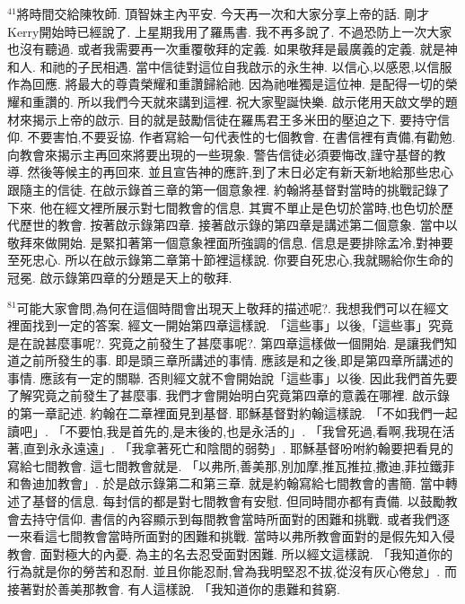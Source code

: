 \documentclass{book}
\begin{document}
$^{41}$將時間交給陳牧師.
頂智妹主內平安.
今天再一次和大家分享上帝的話.
剛才Kerry開始時已經說了.
上星期我用了羅馬書.
我不再多說了.
不過恐防上一次大家也沒有聽過.
或者我需要再一次重覆敬拜的定義.
如果敬拜是最廣義的定義.
就是神和人.
和祂的子民相遇.
當中信徒對這位自我啟示的永生神.
以信心,以感恩,以信服作為回應.
將最大的尊貴榮耀和重讚歸給祂.
因為祂唯獨是這位神.
是配得一切的榮耀和重讚的.
所以我們今天就來講到這裡.
祝大家聖誕快樂.
啟示佬用天啟文學的題材來揭示上帝的啟示.
目的就是鼓勵信徒在羅馬君王多米田的壓迫之下.
要持守信仰.
不要害怕,不要妥協.
作者寫給一句代表性的七個教會.
在書信裡有責備,有勸勉.
向教會來揭示主再回來將要出現的一些現象.
警告信徒必須要悔改,謹守基督的教導.
然後等候主的再回來.
並且宣告神的應許,到了末日必定有新天新地給那些忠心跟隨主的信徒.
在啟示錄首三章的第一個意象裡.
約翰將基督對當時的挑戰記錄了下來.
他在經文裡所展示對七間教會的信息.
其實不單止是色切於當時,也色切於歷代歷世的教會.
按著啟示錄第四章.
接著啟示錄的第四章是講述第二個意象.
當中以敬拜來做開始.
是緊扣著第一個意象裡面所強調的信息.
信息是要排除孟冷,對神要至死忠心.
所以在啟示錄第二章第十節裡這樣說.
你要自死忠心,我就賜給你生命的冠冕.
啟示錄第四章的分題是天上的敬拜.

$^{81}$可能大家會問,為何在這個時間會出現天上敬拜的描述呢?.
我想我們可以在經文裡面找到一定的答案.
經文一開始第四章這樣說.
「這些事」以後,「這些事」究竟是在說甚麼事呢?.
究竟之前發生了甚麼事呢?.
第四章這樣做一個開始.
是讓我們知道之前所發生的事.
即是頭三章所講述的事情.
應該是和之後,即是第四章所講述的事情.
應該有一定的關聯.
否則經文就不會開始說「這些事」以後.
因此我們首先要了解究竟之前發生了甚麼事.
我們才會開始明白究竟第四章的意義在哪裡.
啟示錄的第一章記述.
約翰在二章裡面見到基督.
耶穌基督對約翰這樣說.
「不如我們一起讀吧」.
「不要怕,我是首先的,是末後的,也是永活的」.
「我曾死過,看啊,我現在活著,直到永永遠遠」.
「我拿著死亡和陰間的弱勢」.
耶穌基督吩咐約翰要把看見的寫給七間教會.
這七間教會就是.
「以弗所,善美那,別加摩,推瓦推拉,撒迪,菲拉鐵菲和魯迪加教會」.
於是啟示錄第二和第三章.
就是約翰寫給七間教會的書簡.
當中轉述了基督的信息.
每封信的都是對七間教會有安慰.
但同時間亦都有責備.
以鼓勵教會去持守信仰.
書信的內容顯示到每間教會當時所面對的困難和挑戰.
或者我們逐一來看這七間教會當時所面對的困難和挑戰.
當時以弗所教會面對的是假先知入侵教會.
面對極大的內憂.
為主的名去忍受面對困難.
所以經文這樣說.
「我知道你的行為就是你的勞苦和忍耐.
並且你能忍耐,曾為我明堅忍不拔,從沒有灰心倦怠」.
而接著對於善美那教會.
有人這樣說.
「我知道你的患難和貧窮.
\end{document}
